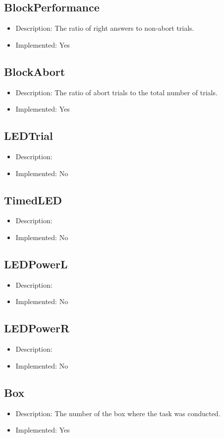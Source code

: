 \subsection*{BlockPerformance}
\begin{itemize}
	\item Description: The ratio of right answers to non-abort trials.
	\item Implemented: Yes
\end{itemize}

\subsection*{BlockAbort}
\begin{itemize}
	\item Description: The ratio of abort trials to the total number of trials.
	\item Implemented: Yes
\end{itemize}

\subsection*{LEDTrial}
\begin{itemize}
	\item Description: 
	\item Implemented: No
\end{itemize}

\subsection*{TimedLED}
\begin{itemize}
	\item Description: 
	\item Implemented: No
\end{itemize}

\subsection*{LEDPowerL}
\begin{itemize}
	\item Description: 
	\item Implemented: No
\end{itemize}

\subsection*{LEDPowerR}
\begin{itemize}
	\item Description: 
	\item Implemented: No
\end{itemize}

\subsection*{Box}
\begin{itemize}
	\item Description: The number of the box where the task was conducted.
	\item Implemented: Yes
\end{itemize}

